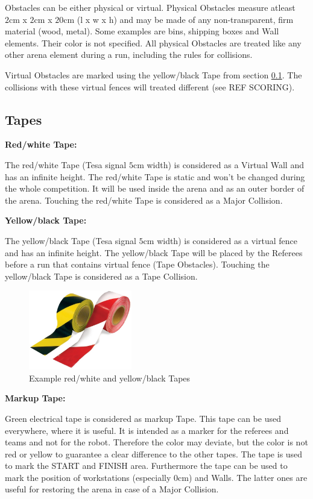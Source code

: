 Obstacles can be either physical or virtual.
Physical Obstacles measure atleast $2\si{\centi\meter}$ x $2\si{\centi\meter}$ x $20\si{\centi\meter}$ (l x w x h) and may be made of any non-transparent, firm material (wood, metal). Some examples are bins, shipping boxes and Wall elements. Their color is not specified.
All physical Obstacles are treated like any other arena element during a run, including the rules for collisions.

Virtual Obstacles are marked using the yellow/black Tape from section \ref{subsec:Tapes}. The collisions with these virtual fences will treated different (see REF SCORING).


\subsection{Tapes}
\label{subsec:Tapes}

\textbf{Red/white Tape:}

The red/white Tape (Tesa signal $5\si{\centi\meter}$ width) is considered as a Virtual Wall and has an infinite height. The red/white Tape is static and won't be changed during the whole competition. It will be used inside the arena and as an outer border of the arena.  Touching the red/white Tape is considered as a Major Collision.

\textbf{Yellow/black Tape:}

The yellow/black Tape (Tesa signal $5\si{\centi\meter}$ width) is considered as a virtual fence and has an infinite height. The yellow/black Tape will be placed by the Referees before a run that contains virtual fence (Tape Obstacles). Touching the yellow/black Tape is considered as a Tape Collision.

\begin{figure} [h!]
	\centering
	\includegraphics[width= 0.4\textwidth ]{./images/general_rules/example_barrier_tape}
	\caption{Example red/white and yellow/black Tapes}
	\label{fig:tapes}
\end{figure}

\textbf{Markup Tape:}

Green electrical tape is considered as markup Tape. This tape can be used everywhere, where it is useful. It is intended as a marker for the referees and teams and not for the robot. Therefore the color may deviate, but the color is not red or yellow to guarantee a clear difference to the other tapes. The tape is used to mark the START and FINISH area. Furthermore the tape can be used to mark the position of workstations (especially $0\si{\centi\meter}$) and Walls. The latter ones are useful for restoring the arena in case of a Major Collision.


